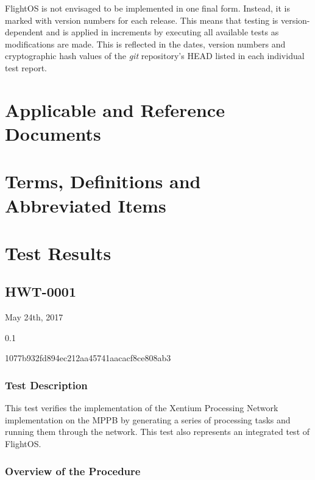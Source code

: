 FlightOS is not envisaged to be implemented in one final form. Instead, it is
marked with version numbers for each release. This means that testing is
version-dependent and is applied in increments by executing all available tests
as modifications are made. This is reflected in the dates, version
numbers and cryptographic hash values of the \emph{git} repository's {HEAD}
listed in each individual test report.

\chapter{Applicable and Reference Documents} %

\printbibliography[heading=none]


\chapter{Terms, Definitions and Abbreviated Items}
\printglossary[type=acronym]
\printglossary[type=main, style=altlist]


\chapter{Test Results}

\section{HWT-0001}

\begin{description}[labelwidth=4em,leftmargin=\parindent,labelindent=\parindent]
	\item[\textbf{Date}]	May 24th, 2017
	\item[\textbf{Version}]	0.1
	\item[\textbf{Hash}]	1077b932fd894ec212aa45741aacacf8ce808ab3
\end{description}

\subsection*{Test Description}

This test verifies the implementation of the \gls{Xentium} Processing Network
implementation on the \gls{MPPB} by generating a series of processing tasks and
running them through the network. This test also represents an integrated test
of FlightOS.

\subsection*{Overview of the Procedure}

